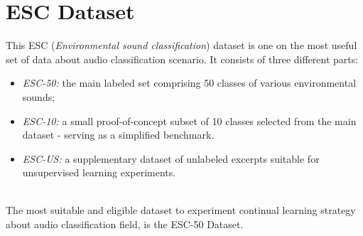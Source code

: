 \documentclass[english, LaM, oneside]{sapthesis}%
\begin{document}
\section{ESC Dataset}
This ESC (\textit{Environmental sound classification}) dataset is one on the most useful set of data about audio classification scenario. It consists of three different parts: 
\begin{itemize}
    \item\textit{ ESC-50: }the main labeled set comprising 50 classes of various environmental sounds;
\textit{}    \item \textit{ESC-10:} a small proof-of-concept subset of 10 classes selected from the main dataset - serving as a simplified benchmark.
    \item \textit{ESC-US:} a supplementary dataset of unlabeled excerpts suitable for unsupervised learning experiments.
\end{itemize}
\\
The most suitable and eligible dataset to experiment continual learning strategy about audio classification field, is the ESC-50 Dataset.
\end{document}
